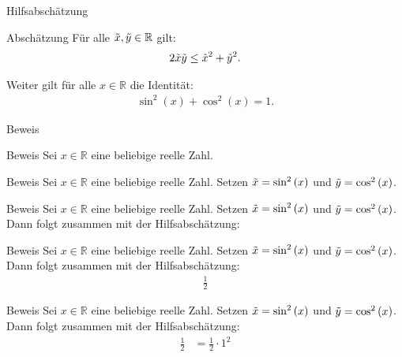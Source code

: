 \documentclass[10pt]{beamer}
\def\bR{\mathbb{R}}
\begin{document}
\begin{frame}{Hilfsabschätzung}
    \begin{block}{Abschätzung}
        Für alle \( \Tilde{x}, \Tilde{y} \in \bR \) gilt:
        \begin{align*}
            2\Tilde{x}\Tilde{y}
            \leq \Tilde{x}^{2} + \Tilde{y}^{2}.
        \end{align*}
    \end{block}
    Weiter gilt für alle \( x \in \bR \) die Identität:
    \begin{align*}
        \sin^{2}\left( x \right) + \cos^{2}\left( x \right) = 1.
    \end{align*}
\end{frame}



\begin{frame}{Beweis}
    
\end{frame}



\begin{frame}{Beweis}
    Sei \( x \in \bR \) eine beliebige reelle Zahl.
\end{frame}



\begin{frame}{Beweis}
    Sei \( x \in \bR \) eine beliebige reelle Zahl. Setzen \( \Tilde{x} = \sin^{2}\left( x \right) \) und \( \Tilde{y} = \cos^{2}\left( x \right) \). 
\end{frame}



\begin{frame}{Beweis}
    Sei \( x \in \bR \) eine beliebige reelle Zahl. Setzen \( \Tilde{x} = \sin^{2}\left( x \right) \) und \( \Tilde{y} = \cos^{2}\left( x \right) \). Dann folgt zusammen mit der Hilfsabschätzung:
\end{frame}



\begin{frame}{Beweis}
    Sei \( x \in \bR \) eine beliebige reelle Zahl. Setzen \( \Tilde{x} = \sin^{2}\left( x \right) \) und \( \Tilde{y} = \cos^{2}\left( x \right) \). Dann folgt zusammen mit der Hilfsabschätzung:
    \begin{align*}
        \frac{1}{2}
    \end{align*}
\end{frame}



\begin{frame}{Beweis}
    Sei \( x \in \bR \) eine beliebige reelle Zahl. Setzen \( \Tilde{x} = \sin^{2}\left( x \right) \) und \( \Tilde{y} = \cos^{2}\left( x \right) \). Dann folgt zusammen mit der Hilfsabschätzung:
    \begin{align*}
        \frac{1}{2}
        & = \frac{1}{2} \cdot 1^{2}
    \end{align*}
\end{frame}
\end{document}

